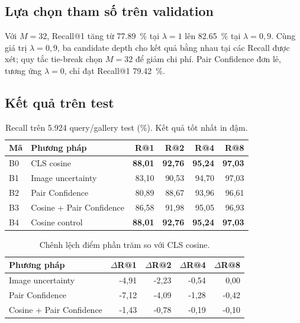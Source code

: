 \documentclass[11pt,a4paper]{article}
\begin{document}
\subsection{Lựa chọn tham số trên validation}
Với $M=32$, Recall@1 tăng từ \SI{77.89}{\percent} tại $\lambda=1$ lên \SI{82.65}{\percent} tại $\lambda=0,9$. Cùng giá trị $\lambda=0,9$, ba candidate depth cho kết quả bằng nhau tại các Recall được xét; quy tắc tie-break chọn $M=32$ để giảm chi phí. Pair Confidence đơn lẻ, tương ứng $\lambda=0$, chỉ đạt Recall@1 \SI{79.42}{\percent}.

\subsection{Kết quả trên test}

\begin{table}[htbp]
\centering
\caption{Recall trên 5.924 query/gallery test (\%). Kết quả tốt nhất in đậm.}
\label{tab:e2b-results}
\begin{tabular}{@{}llrrrr@{}}
\toprule
Mã & Phương pháp & R@1 & R@2 & R@4 & R@8\\
\midrule
B0 & CLS cosine & \textbf{88,01} & \textbf{92,76} & \textbf{95,24} & \textbf{97,03}\\
B1 & Image uncertainty & 83,10 & 90,53 & 94,70 & 97,03\\
B2 & Pair Confidence & 80,89 & 88,67 & 93,96 & 96,61\\
B3 & Cosine + Pair Confidence & 86,58 & 91,98 & 95,05 & 96,93\\
B4 & Cosine control & \textbf{88,01} & \textbf{92,76} & \textbf{95,24} & \textbf{97,03}\\
\bottomrule
\end{tabular}
\end{table}

\begin{table}[htbp]
\centering
\caption{Chênh lệch điểm phần trăm so với CLS cosine.}
\begin{tabular}{@{}lrrrr@{}}
\toprule
Phương pháp & $\Delta$R@1 & $\Delta$R@2 & $\Delta$R@4 & $\Delta$R@8\\
\midrule
Image uncertainty & -4,91 & -2,23 & -0,54 & 0,00\\
Pair Confidence & -7,12 & -4,09 & -1,28 & -0,42\\
Cosine + Pair Confidence & -1,43 & -0,78 & -0,19 & -0,10\\
\bottomrule
\end{tabular}
\end{table}
\end{document}
